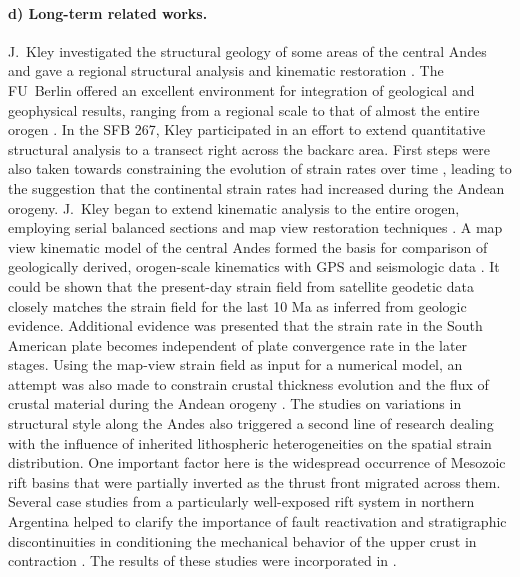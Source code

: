 \documentclass[twoside,10pt]{article}
\begin{document}
\paragraph{d) Long-term related works.}
J.~Kley investigated the structural geology of some areas of the central Andes \cite{Kley1993} and gave a regional structural analysis and kinematic restoration \cite{Kley1996,Kley1994}. 
The FU~Berlin offered an excellent environment for integration of geological and geophysical results, ranging from a regional scale \cite{Kley1996a} to that of almost the entire orogen \cite{Schmitz1997}. 
In the SFB 267, Kley participated in an effort to extend quantitative structural analysis to a transect right across the backarc area. 
First steps were also taken towards constraining the evolution of strain rates over time \cite{Kley1997}, leading to the suggestion that the continental strain rates had increased during the Andean orogeny. 
J.~Kley began to extend kinematic analysis to the entire orogen, employing serial balanced sections and map view restoration techniques \cite{Kley1998a}. 
A map view kinematic model of the central Andes \cite{Kley1999} formed the basis for comparison of geologically derived, orogen-scale kinematics with GPS and seismologic data 
\cite{Hindle2002,Hindle2002a,Klosko2002}. 
It could be shown that the present-day strain field from satellite geodetic data closely matches the strain field for the last 10 Ma as inferred from geologic evidence. 
Additional evidence was presented that the strain rate in the South American plate becomes independent of plate convergence rate in the later stages.%
Using the map-view strain field as input for a numerical model, an attempt was also made 
to constrain crustal thickness evolution and the flux of crustal material 
during the Andean orogeny \cite{Hindle2005}. The studies on variations in structural style 
along the Andes \cite{Kley1998} also triggered a second line of research 
dealing with the influence of inherited lithospheric heterogeneities 
on the spatial strain distribution. One important factor here is the widespread occurrence 
of Mesozoic rift basins \cite{Kley1999b} that were partially inverted as the thrust front 
migrated across them. Several case studies from a particularly well-exposed rift system 
in northern Argentina helped to clarify the importance of fault reactivation 
and stratigraphic discontinuities in conditioning the mechanical behavior 
of the upper crust in contraction \cite{Kley1999a,Kley2002,Kley2005,Monaldi2008}.
The results of these studies were incorporated in \cite{Oncken2006,Kley2007}. 
\end{document}
